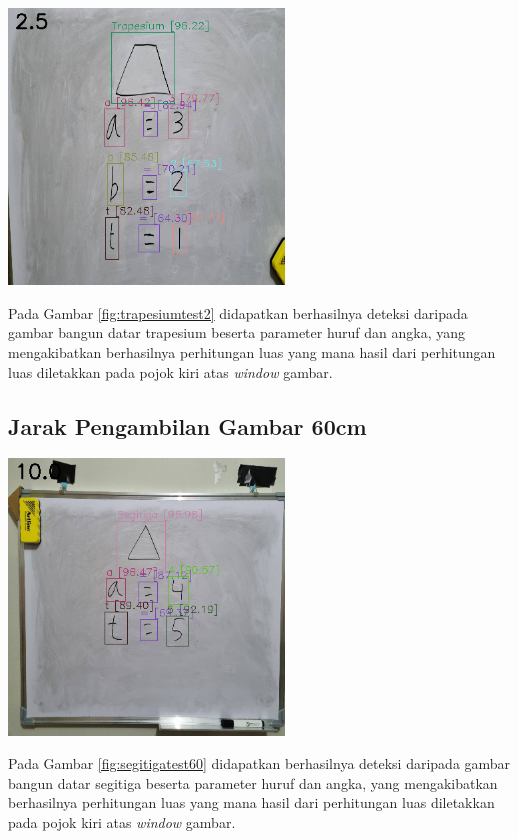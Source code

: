\begin{center}
	\includegraphics[width=0.55\textwidth]{gambar/trapesium2.png}
	\label{fig:trapesiumtest2}
\end{center}
Pada Gambar \ref{fig:trapesiumtest2} didapatkan berhasilnya deteksi daripada gambar bangun datar trapesium beserta parameter huruf dan angka, yang mengakibatkan berhasilnya perhitungan luas yang mana hasil dari perhitungan luas diletakkan pada pojok kiri atas \textit{window} gambar.

\subsection{Jarak Pengambilan Gambar 60cm}
\begin{center}
	\includegraphics[width=0.55\textwidth]{gambar/seg60hasil.png}
	\label{fig:segitigatest60}
\end{center}
Pada Gambar \ref{fig:segitigatest60} didapatkan berhasilnya deteksi daripada gambar bangun datar segitiga beserta parameter huruf dan angka, yang mengakibatkan berhasilnya perhitungan luas yang mana hasil dari perhitungan luas diletakkan pada pojok kiri atas \textit{window} gambar.

